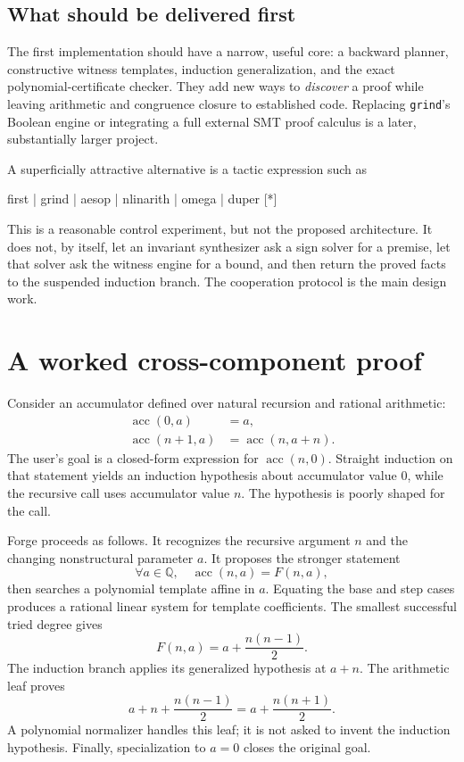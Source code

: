 \documentclass[11pt,a4paper]{article}
\newcommand{\grind}{\texttt{grind}}
\newcommand{\Q}{\mathbb{Q}}
\begin{document}
\subsection{What should be delivered first}

The first implementation should have a narrow, useful core: a backward planner, constructive witness templates, induction generalization, and the exact polynomial-certificate checker. They add new ways to \emph{discover} a proof while leaving arithmetic and congruence closure to established code. Replacing \grind's Boolean engine or integrating a full external SMT proof calculus is a later, substantially larger project.

A superficially attractive alternative is a tactic expression such as
\begin{code}
first | grind | aesop | nlinarith | omega | duper [*]
\end{code}
This is a reasonable control experiment, but not the proposed architecture. It does not, by itself, let an invariant synthesizer ask a sign solver for a premise, let that solver ask the witness engine for a bound, and then return the proved facts to the suspended induction branch. The cooperation protocol is the main design work.

\section{A worked cross-component proof}
\label{sec:worked}

Consider an accumulator defined over natural recursion and rational arithmetic:
\begin{align*}
\operatorname{acc}(0,a)&=a,\\
\operatorname{acc}(n+1,a)&=\operatorname{acc}(n,a+n).
\end{align*}
The user's goal is a closed-form expression for $\operatorname{acc}(n,0)$. Straight induction on that statement yields an induction hypothesis about accumulator value $0$, while the recursive call uses accumulator value $n$. The hypothesis is poorly shaped for the call.

Forge proceeds as follows. It recognizes the recursive argument $n$ and the changing nonstructural parameter $a$. It proposes the stronger statement
\[
\forall a\in\Q,\quad \operatorname{acc}(n,a)=F(n,a),
\]
then searches a polynomial template affine in $a$. Equating the base and step cases produces a rational linear system for template coefficients. The smallest successful tried degree gives
\[
F(n,a)=a+\frac{n(n-1)}2.
\]
The induction branch applies its generalized hypothesis at $a+n$. The arithmetic leaf proves
\[
a+n+\frac{n(n-1)}2
   =a+\frac{n(n+1)}2.
\]
A polynomial normalizer handles this leaf; it is not asked to invent the induction hypothesis. Finally, specialization to $a=0$ closes the original goal.
\end{document}
